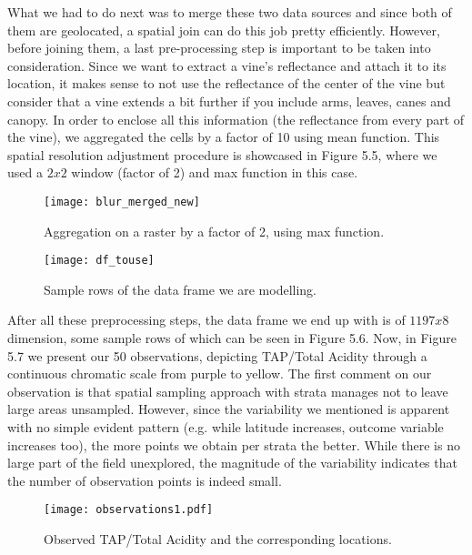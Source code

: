 \documentclass[12pt,a4paper,oneside]{book}
\theoremstyle{plain}
\theoremstyle{definition}
\begin{document}
{\vspace{3mm}
\noindent
What we had to do next was to merge these two data sources and since both of them are geolocated, a spatial join can do this job pretty efficiently. However, before joining them, a last pre-processing step is important to be taken into consideration. Since we want to extract a vine's reflectance and attach it to its location, it makes sense to not use the reflectance of the center of the vine but consider that a vine extends a bit further if you include arms, leaves, canes and canopy. In order to enclose all this information (the reflectance from every part of the vine), we aggregated the cells by a factor of 10 using mean function. This spatial resolution adjustment procedure is showcased in Figure 5.5, where we used a $2x2$ window (factor of 2) and max function in this case.  
\begin{figure}[h]
\begin{flushleft}
\texttt{[image: blur\_merged\_new]}
\caption{Aggregation on a raster by a factor of 2, using max function.}
\end{flushleft}
\end{figure}
\begin{figure}[h]
\begin{center}
\texttt{[image: df\_touse]}
\caption{Sample rows of the data frame we are modelling.}
\end{center}
\end{figure}

\vspace{2mm}
\noindent
After all these preprocessing steps, the data frame we end up with is of $1197x8$ dimension, some sample rows of which can be seen in Figure 5.6. Now, in Figure 5.7 we present our 50 observations, depicting TAP/Total Acidity through a continuous chromatic scale from purple to yellow. The first comment on our observation is that spatial sampling approach with strata manages not to leave large areas unsampled. However, since the variability we mentioned is apparent with no simple evident pattern (e.g. while latitude increases, outcome variable increases too), the more points we obtain per strata the better. While there is no large part of the field unexplored, the magnitude of the variability indicates that the number of observation points is indeed small. 
\begin{figure}[h]
\begin{center}
\texttt{[image: observations1.pdf]}
\caption{Observed TAP/Total Acidity and the corresponding locations.}
\end{center}
\end{figure}

}
\end{document}
